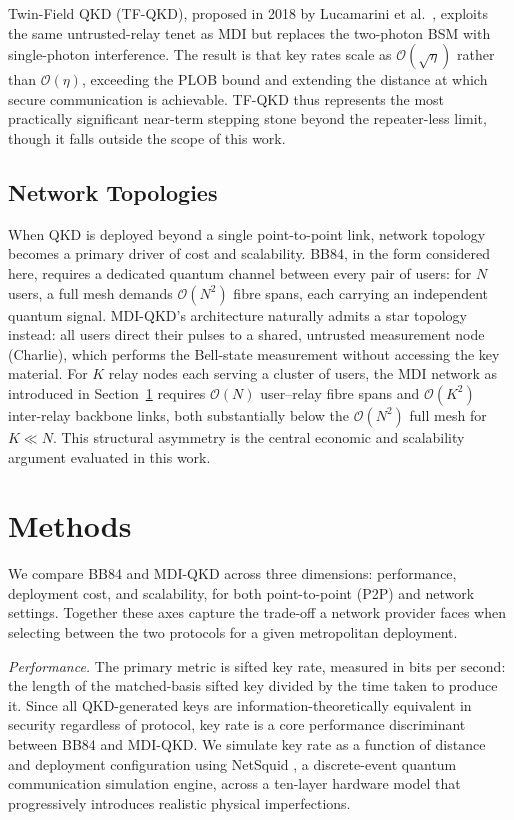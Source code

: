 \documentclass[12pt]{article}
\let\oldsection\section
\renewcommand{\section}{\clearpage\oldsection}
\begin{document}
Twin-Field QKD (TF-QKD), proposed in 2018 by Lucamarini et al.\ \cite{Lucamarini_2018}, exploits the same untrusted-relay tenet as MDI but replaces the two-photon BSM with single-photon interference. The result is that key rates scale as $\mathcal{O}(\sqrt{\eta})$ rather than $\mathcal{O}(\eta)$, exceeding the PLOB bound and extending the distance at which secure communication is achievable. TF-QKD thus represents the most practically significant near-term stepping stone beyond the repeater-less limit, though it falls outside the scope of this work.

\subsection{Network Topologies}
\label{sec:network_topologies}

When QKD is deployed beyond a single point-to-point link, network topology becomes a primary driver of cost and scalability. BB84, in the form considered here, requires a dedicated quantum channel between every pair of users: for $N$ users, a full mesh demands $\mathcal{O}(N^2)$ fibre spans, each carrying an independent quantum signal. MDI-QKD's architecture naturally admits a star topology instead: all users direct their pulses to a shared, untrusted measurement node (Charlie), which performs the Bell-state measurement without accessing the key material. For $K$ relay nodes each serving a cluster of users, the MDI network as introduced in Section~\ref{sec:methodology} requires $\mathcal{O}(N)$ user--relay fibre spans and $\mathcal{O}(K^2)$ inter-relay backbone links, both substantially below the $\mathcal{O}(N^2)$ full mesh for $K\ll N$. This structural asymmetry is the central economic and scalability argument evaluated in this work.

\section{Methods}
\label{sec:methodology}
We compare BB84 and MDI-QKD across three dimensions: performance, deployment cost, and scalability, for both point-to-point (P2P) and network settings. Together these axes capture the trade-off a network provider faces when selecting between the two protocols for a given metropolitan deployment.

\textit{Performance.} The primary metric is sifted key rate, measured in bits per second: the length of the matched-basis sifted key divided by the time taken to produce it. Since all QKD-generated keys are information-theoretically equivalent in security regardless of protocol, key rate is a core performance discriminant between BB84 and MDI-QKD. We simulate key rate as a function of distance and deployment configuration using NetSquid \cite{Coopmans_2021}, a discrete-event quantum communication simulation engine, across a ten-layer hardware model that progressively introduces realistic physical imperfections.
\end{document}
